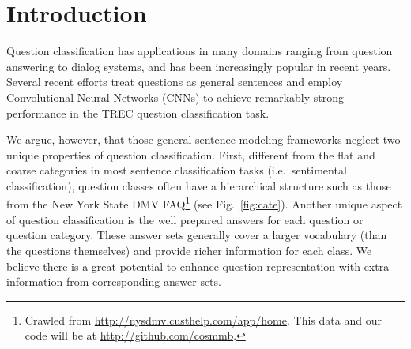 \section{Introduction}
\label{sec:intro}

Question classification has applications
in many domains ranging from question answering to dialog systems, 
and has been increasingly popular in recent years.
Several recent efforts \cite{kim:2014,blunsom:2014,ma+:2015} treat questions as general sentences and employ Convolutional Neural Networks (CNNs) to achieve
remarkably strong performance
in the TREC question classification task.

\iffalse

Most existing approaches to this problem
simply use existing sentence modeling frameworks
and treat questions as general sentences,
without any special treatment. %
For example, %
several recent efforts employ Convolutional Neural Networks (CNNs)
to achieve remarkably strong performance
in the TREC question classification task
as well as other sentence classification
tasks such as sentiment analysis \cite{kim:2014,blunsom:2014,ma+:2015}.

\fi





We argue, however, that
those general sentence modeling frameworks neglect two unique
properties of question classification. 
First, different from the flat and coarse categories in most sentence classification tasks (i.e.~sentimental classification), %
question classes often have a hierarchical structure such as those from the New York State DMV FAQ\footnote{Crawled from {\scriptsize\url{http://nysdmv.custhelp.com/app/home}}.
This data and our code will be at {\scriptsize\url{http://github.com/cosmmb}}.} (see Fig.~\ref{fig:cate}).
Another unique aspect of question classification is the well prepared answers %
for each question  or question category.
These answer sets generally cover a larger vocabulary (than the questions themselves) and provide richer information %
for each class.
We believe there is a great potential to enhance question representation with extra information from corresponding answer sets.

